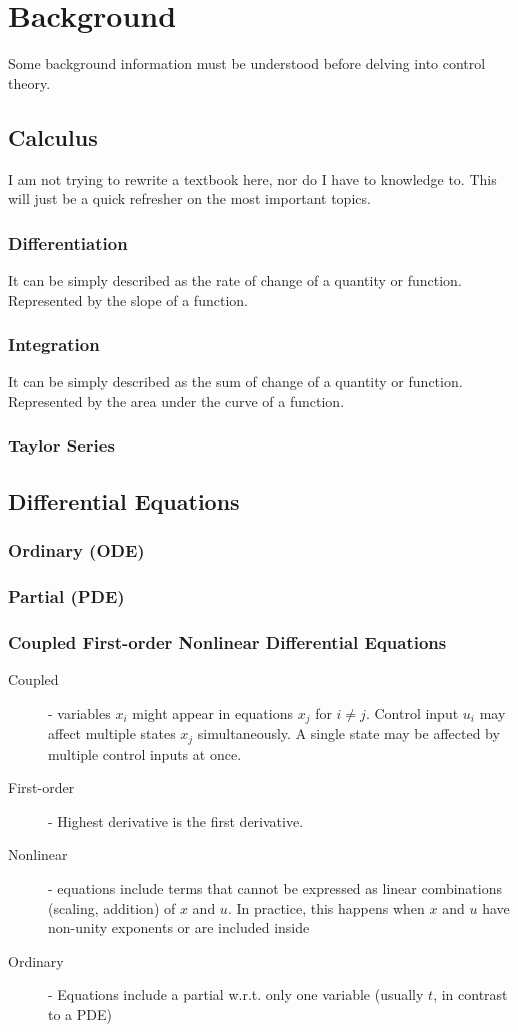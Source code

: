 \documentclass[../notes.tex]{subfiles}
\begin{document}
\section{Background}
Some background information must be understood before delving into control theory.
\subsection{Calculus}
I am not trying to rewrite a textbook here, nor do I have to knowledge to. This will just be a quick refresher on the most important topics.
\subsubsection{Differentiation}
It can be simply described as the rate of change of a quantity or function. Represented by the slope of a function.
\subsubsection{Integration}
It can be simply described as the sum of change of a quantity or function. Represented by the area under the curve of a function.

\subsubsection{Taylor Series}

\subsection{Differential Equations}
\subsubsection{Ordinary (ODE)}
\subsubsection{Partial (PDE)}
\subsubsection{Coupled First-order Nonlinear Differential Equations} \label{sec:coupled_diff_eq}
\begin{description}
    \item[Coupled] - variables $x_i$ might appear in equations $x_j$ for $i \neq j$. Control input $u_i$ may affect multiple states $x_j$ simultaneously. A single state may be affected by multiple control inputs at once.
    \item[First-order] - Highest derivative is the first derivative.
    \item[Nonlinear] - equations include terms that cannot be expressed as linear combinations (scaling, addition) of $x$ and $u$. In practice, this happens when $x$ and $u$ have non-unity exponents or are included inside
    \item[Ordinary] - Equations include a partial w.r.t. only one variable (usually $t$, in contrast to a PDE)    
\end{description}
\end{document}
